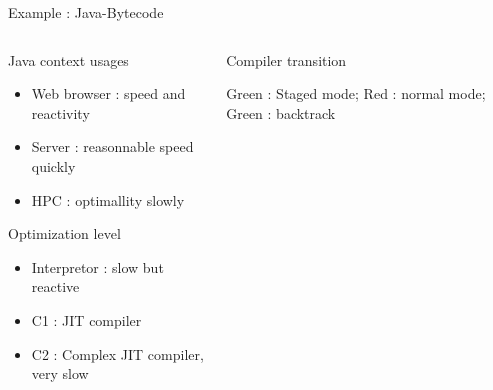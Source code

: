 %
\begin{Frame}{Example : Java-Bytecode}
  \begin{columns}[t]
    \begin{column}{5cm} %
      \begin{block}{Java context usages}
        \begin{itemize}
        \item Web browser : speed and reactivity
        \item Server : reasonnable speed quickly
        \item HPC : optimallity slowly
        \end{itemize}
      \end{block} 
      \begin{block}{Optimization level}
        \begin{itemize}
        \item Interpretor : slow but reactive
        \item C1 : JIT compiler
        \item C2 : Complex JIT compiler, very slow
        \end{itemize}
      \end{block} 
    \end{column}
    
    \begin{column}{5cm} %
      \begin{block}{Compiler transition}
      \end{block}
      Green : Staged mode; Red : normal mode; Green : backtrack
    \end{column}
  \end{columns}  
\end{Frame}


